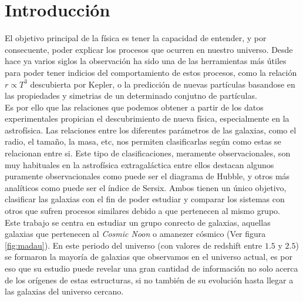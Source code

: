 \documentclass[11pt, a4paper]{article} %
\begin{document}
\newpage

\tableofcontents


\section{Introducción}

El objetivo principal de la física es tener la capacidad de entender, y por consecuente, poder explicar los procesos que ocurren en 
nuestro universo. Desde hace ya varios siglos la observación ha sido una de las herramientas más útiles para poder tener indicios del comportamiento de estos procesos,
como la relación $r\propto T^3$ descubierta por Kepler, o la predicción de nuevas partículas basandose en las propiedades y simetrias de un 
determinado conjutno de partículas. \\

Es por ello que las relaciones que podemos obtener a partir de los datos experimentales propician el descubrimiento de nueva física, especialmente en la astrofísica.
Las relaciones entre los diferentes parámetros de las galaxias, como el radio, el tamaño, la masa, etc, nos permiten clasificarlas según como estas se relacionan entre si. 
Este tipo de clasificaciones, meramente observacionales, son muy habituales en la astrofísica extragaláctica entre ellos destacan algunos puramente observacionales como puede ser el diagrama de Hubble, 
y otros más analíticos como puede ser el índice de Sersix. Ambos tienen un único objetivo, clasificar las galaxias con el fin de poder estudiar y comparar los sistemas con otros que sufren procesos similares debido a que pertenecen al mismo grupo.\\

Este trabajo se centra en estudiar un grupo conrecto de galaxias, aquellas galaxias que pertenecen al \textit{Cosmic Noon} o 
amanezer cósmico (Ver figura \ref{fig:madau}). En este periodo del universo (con valores de redshift entre $1.5$ y $2.5$) se formaron la mayoría de galaxias que 
observamos en el universo actual, es por eso que su estudio puede revelar una gran cantidad de información no solo acerca de los orígenes
de estas estructuras, si no también de su evolución hasta llegar a las galaxias del universo cercano. \\

\end{document}
